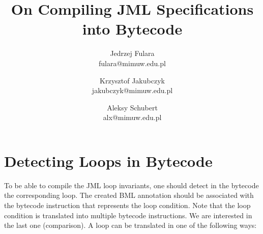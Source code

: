 \documentclass{acm_proc_article-sp}
\author{Jedrzej Fulara\\fulara@mimuw.edu.pl\and Krzysztof Jakubczyk\\jakubczyk@mimuw.edu.pl\and Aleksy Schubert\\alx@mimuw.edu.pl}
\title{On Compiling JML Specifications into Bytecode}
\begin{document}
\maketitle



\section{Detecting Loops in Bytecode}
To be able to compile the JML loop invariants, one should detect in the bytecode the corresponding loop. The created BML annotation should be associated with the bytecode instruction that represents the loop condition. Note that the loop condition is translated into multiple bytecode instructions. We are interested in the last one (comparison). A loop can be translated in one of the following ways:
\end{document}
